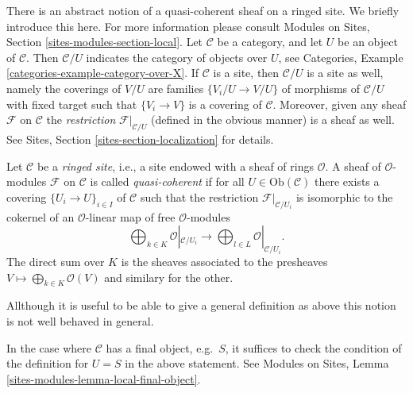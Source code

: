 \noindent
There is an abstract notion of a quasi-coherent sheaf on a ringed site.
We briefly introduce this here. For more information please consult
Modules on Sites, Section \ref{sites-modules-section-local}.
Let $\mathcal{C}$ be a category, and let $U$ be an object of $\mathcal{C}$.
Then $\mathcal{C}/U$ indicates the category of objects over $U$, see
Categories, Example \ref{categories-example-category-over-X}.
If $\mathcal{C}$ is a site, then $\mathcal{C}/U$ is a site as well, namely
the coverings of $V/U$ are families $\{V_i/U \to V/U\}$ of morphisms
of $\mathcal{C}/U$ with fixed target such that
$\{V_i \to V\}$ is a covering of $\mathcal{C}$. Moreover, given any
sheaf $\mathcal{F}$ on $\mathcal{C}$ the {\it restriction}
$\mathcal{F}|_{\mathcal{C}/U}$ (defined in the obvious manner)
is a sheaf as well. See
Sites, Section \ref{sites-section-localization}
for details.

\begin{definition}
\label{definition-ringed-site}
Let $\mathcal{C}$ be a {\it ringed site}, i.e., a site endowed with a
sheaf of rings $\mathcal{O}$. A sheaf of $\mathcal{O}$-modules $\mathcal{F}$ on
$\mathcal{C}$ is called {\it quasi-coherent} if for all
$U \in \text{Ob}(\mathcal{C})$ there exists a covering
$\{U_i \to U\}_{i\in I}$ of $\mathcal{C}$ such that the restriction
$\mathcal{F}|_{\mathcal{C}/U_i}$ is isomorphic to the cokernel of
an $\mathcal{O}$-linear map of free $\mathcal{O}$-modules
$$
\bigoplus\nolimits_{k \in K} \mathcal{O}|_{\mathcal{C}/U_i}
\longrightarrow
\bigoplus\nolimits_{l \in L} \mathcal{O}|_{\mathcal{C}/U_i}.
$$
The direct sum over $K$ is the sheaves associated to the presheaves
$V \mapsto \bigoplus_{k \in K} \mathcal{O}(V)$ and similary for the other.
\end{definition}

\noindent
Allthough it is useful to be able to give a general definition as above
this notion is not well behaved in general.

\begin{remark}
\label{remark-final-object}
In the case where $\mathcal{C}$ has a final object, e.g.\ $S$, it
suffices to check the condition of the definition for
$U = S$ in the above statement. See
Modules on Sites, Lemma \ref{sites-modules-lemma-local-final-object}.
\end{remark}

